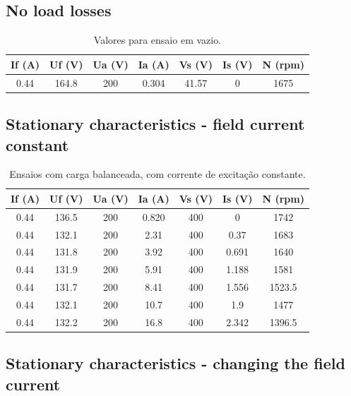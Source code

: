 \documentclass[12pt,a4paper,oneside]{article}
\begin{document}
\subsection{No load losses}

\begin{table}[htb!]
\centering
\begin{tabular}{ccccccc}
\hline
If (A) & Uf (V) & Ua (V) & Ia (A) & Vs (V) & Is (V) & N (rpm) \\ \hline
0.44 & 164.8 & 200 & 0.304 & 41.57 & 0 & 1675 \\ \hline
\end{tabular}
\caption{Valores para ensaio em vazio.}
\label{tab:vazio}
\end{table}

\subsection{Stationary characteristics - field current constant}

\begin{table}[htb!]
\centering
\begin{tabular}{ccccccc}
\hline
If (A) & Uf (V) & Ua (V) & Ia (A) & Vs (V) & Is (V) & N (rpm) \\ \hline
0.44 & 136.5 & 200 & 0.820 & 400 & 0 & 1742 \\ \hline
0.44 & 132.1 & 200 & 2.31 & 400 & 0.37 & 1683 \\ \hline
0.44 & 131.8 & 200 & 3.92 & 400 & 0.691 & 1640 \\ \hline
0.44 & 131.9 & 200 & 5.91 & 400 & 1.188 & 1581 \\ \hline
0.44 & 131.7 & 200 & 8.41 & 400 & 1.556 & 1523.5 \\ \hline
0.44 & 132.1 & 200 & 10.7 & 400 & 1.9 & 1477 \\ \hline
0.44 & 132.2 & 200 & 16.8 & 400 & 2.342 & 1396.5 \\ \hline
\end{tabular}
\caption{Ensaios com carga balanceada, com corrente de excitação constante.}
\label{tab:load1}
\end{table}
\subsection{Stationary characteristics - changing the field current}
\end{document}
